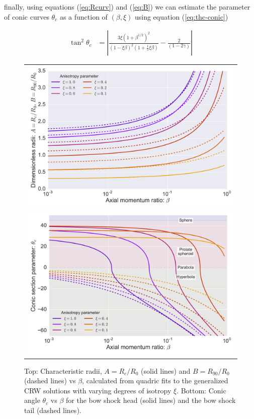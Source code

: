 finally, using equations (\ref{eq:Rcurv}) and (\ref{eq:B}) we can estimate the parameter of conic curves $\theta_c$ as a function of $(\beta,\xi)$ using equation (\ref{eq:thc-conic})

\begin{align}
\tan^2\theta_c &= \left| \frac{3\xi\left(1+\beta^{1/2}\right)^2}{\left(1-\xi\beta\right)^2\left(1+\frac{1}{5}\xi\beta\right)}-\frac{2}{\left(1-2\gamma\right)}\right| 
\label{eq:thc-CRW}
\end{align}

\begin{figure}
\begin{tabular}{c}
\includegraphics[width=\linewidth]{figs/AB-beta-log} \\
\includegraphics[width=\linewidth]{figs/thc-beta-log}
\end{tabular}
\caption{Top: Characteristic radii, $A = R_c/R_0$ (solid lines) and $B
  = R_{90}/R_0$ (dashed lines)
  vs $\beta$, calculated from quadric fits to the generalized CRW
  solutions with varying degrees of isotropy $\xi$.  Bottom: Conic
  angle $\theta_c$ vs $\beta$ for the bow 
  shock head (solid lines) and the bow shock tail (dashed lines).}
\label{fig:rad-beta}
\end{figure}


